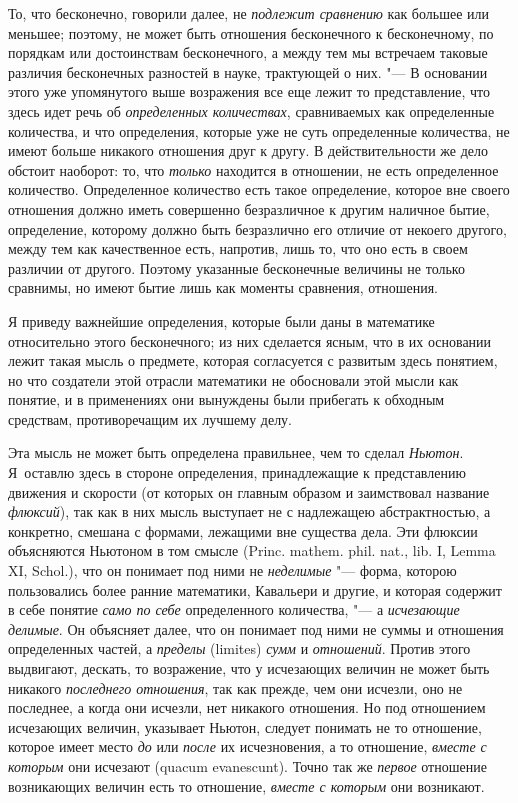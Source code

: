 То, что бесконечно, говорили далее, не {\em подлежит
сравнению} как большее или меньшее; поэтому, не может быть отношения
бесконечного к бесконечному, по порядкам или достоинствам бесконечного, а
между тем мы встречаем таковые различия бесконечных разностей в науке,
трактующей о них. "--- В основании этого уже упомянутого выше возражения все
еще лежит то представление, что здесь идет речь об
{\em определенных количествах}, сравниваемых как
определенные количества, и что определения, которые уже не суть
определенные количества, не имеют больше никакого отношения друг к другу. В
действительности же дело обстоит наоборот: то, что
{\em только} находится в отношении, не есть
определенное количество. Определенное количество есть такое определение,
которое вне своего отношения должно иметь совершенно безразличное к другим
наличное бытие, определение, которому должно быть безразлично его отличие
от некоего другого, между тем как качественное есть, напротив, лишь то, что
оно есть в своем различии от другого. Поэтому указанные бесконечные
величины не только сравнимы, но имеют бытие лишь как моменты сравнения,
отношения.

Я приведу важнейшие определения, которые были даны в математике относительно
этого бесконечного; из них сделается ясным, что в их основании лежит такая
мысль о предмете, которая согласуется с развитым здесь понятием, но что
создатели этой отрасли математики не обосновали этой мысли как понятие, и в
применениях они вынуждены были прибегать к обходным средствам,
противоречащим их лучшему делу.

Эта мысль не может быть определена правильнее, чем то сделал
{\em Ньютон}. Я~оставлю здесь в стороне определения,
принадлежащие к представлению движения и скорости (от которых он главным
образом и заимствовал название {\em флюксий}), так как
в них мысль выступает не с надлежащею абстрактностью, а конкретно, смешана
с формами, лежащими вне существа дела. Эти флюксии объясняются Ньютоном в
том смысле
(Princ. mathem. phil. nat., lib. I, Lemma XI, Schol.),
что он понимает под ними не
{\em неделимые} "--- форма, которою пользовались более
ранние математики, Кавальери и другие, и которая содержит в себе понятие
{\em само по себе} определенного количества, "--- а
{\em исчезающие делимые}. Он объясняет далее, что он
понимает под ними не суммы и отношения определенных частей, а
{\em пределы} (limites) {\em сумм}
и {\em отношений}. Против этого выдвигают, дескать, то
возражение, что у исчезающих величин не может быть никакого
{\em последнего отношения}, так как прежде, чем они
исчезли, оно не последнее, а когда они исчезли, нет никакого отношения. Но
под отношением исчезающих величин, указывает Ньютон, следует понимать не то
отношение, которое имеет место {\em до} или
{\em после} их исчезновения, а то отношение,
{\em вместе с которым} они исчезают (quacum
evanescunt). Точно так же {\em первое} отношение
возникающих величин есть то отношение, {\em вместе с
которым} они возникают.

